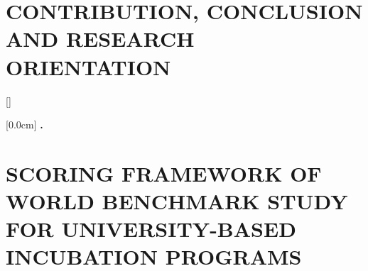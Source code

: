 \documentclass[a4paper,12pt,twoside]{extreport}
\renewcommand{\bibname}{references}
\renewcommand{\figurename}{Figure}
\renewcommand{\tablename}{Table}
\renewcommand{\chaptername}{CHAPTER}
\theoremstyle{definition}
\begin{document}
\newpage
\pagestyle{fancy}
\chapter{CONTRIBUTION, CONCLUSION AND RESEARCH ORIENTATION}
\label{chapter:Contribution_conclusion_and_research_orientation}



\newpage
\renewcommand\bibname{REFERENCE}
\label{chapter:Reference}
\printbibliography
{}

\appendixpage
\appendices
\addappheadtotoc
\renewcommand{\figurename}{Figure}
\renewcommand{\tablename}{Table}
\renewcommand{\chaptername}{CHAPTER}


{}[]
\titlespacing*{\chapter}{0pt}{-20pt}{20pt}

[0.0cm]             %
{\bfseries\vspace{0.3cm}}                  %
{{\bfseries{\scshape} \thecontentslabel.\ }} %
{}         %
{\contentspage}         %

\chapter{SCORING FRAMEWORK OF WORLD BENCHMARK STUDY FOR UNIVERSITY-BASED INCUBATION PROGRAMS}
\label{appendix:a_scoring_framework}

\newpage

% 
\end{document}
